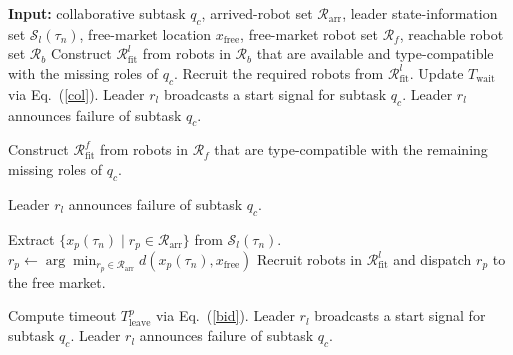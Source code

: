 \documentclass[lettersize,journal]{IEEEtran}
\begin{document}

\begin{algorithm}[H]
\caption{Timeout-Triggered Recruitment}
\label{alg:leader_timeout}
\begin{algorithmic}[1]
\STATE \textbf{Input:} collaborative subtask $q_c$, arrived-robot set $\mathcal{R}_{\mathrm{arr}}$, leader state-information set $\mathcal{S}_l(\tau_n)$, free-market location $x_{\mathrm{free}}$, free-market robot set $\mathcal{R}_f$, reachable robot set $\mathcal{R}_b$
\STATE Construct $\mathcal{R}_{\mathrm{fit}}^{l}$ from robots in $\mathcal{R}_b$ that are available and type-compatible with the missing roles of $q_c$.
\STATE Recruit the required robots from $\mathcal{R}_{\mathrm{fit}}^{l}$.
\STATE Update $T_{\mathrm{wait}}$ via Eq.~(\ref{col}).
\STATE Leader $r_l$ broadcasts a start signal for subtask $q_c$.
\ELSE
\STATE Leader $r_l$ announces failure of subtask $q_c$.
\ENDIF
\ENDIF

\STATE Construct $\mathcal{R}_{\mathrm{fit}}^{f}$ from robots in $\mathcal{R}_f$ that are type-compatible with the remaining missing roles of $q_c$.

\STATE Leader $r_l$ announces failure of subtask $q_c$.
\ENDIF

\STATE Extract $\{x_p(\tau_n)\mid r_p \in \mathcal{R}_{\mathrm{arr}}\}$ from $\mathcal{S}_l(\tau_n)$.
\STATE $r_p \leftarrow \arg\min_{r_p \in \mathcal{R}_{\mathrm{arr}}} d(x_p(\tau_n), x_{\mathrm{free}})$
\STATE Recruit robots in $\mathcal{R}_{\mathrm{fit}}^{l}$ and dispatch $r_p$ to the free market.

\STATE Compute timeout $T_{\mathrm{leave}}^p$ via Eq.~(\ref{bid}).
\STATE Leader $r_l$ broadcasts a start signal for subtask $q_c$.
\STATE Leader $r_l$ announces failure of subtask $q_c$.
\ENDIF

\ENDIF
\end{algorithmic}
\end{algorithm}
\end{document}
